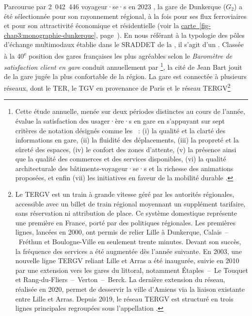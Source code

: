 \begin{refsegment}
Parcourue par 2~042~446 voyageur·se·s en 2023 \textcolor{blue}{\autocite{sncf_frequentation_2024}}, la gare de Dunkerque (\(G_2\)) a été sélectionnée pour son rayonnement régional, à la fois pour ses flux ferroviaires et pour son attractivité économique et résidentielle (voir la \hyperref[fig-chap3:monographie-dunkerque]{carte~\ref{fig-chap3:monographie-dunkerque}}, page~\pageref{fig-chap3:monographie-dunkerque}). En nous référant à la typologie des pôles d'échange multimodaux établie dans le \acrshort{SRADDET} de la \textcolor{blue}{\textcite[81]{region_hauts-de-france_sraddet_2024}}, il s'agit d'un . Classée à la 40\textsuperscript{e} position des gares françaises les plus agréables selon le \textsl{Baromètre de satisfaction client en gare} conduit annuellement par \textcolor{blue}{\textcite{sncf_gares__connexions_barometre_2023}}\footnote{
    Cette étude annuelle, menée sur deux périodes distinctes au cours de l’année, évalue la satisfaction des usager·ère·s en gare en s’appuyant sur sept critères de notation désignés comme les ~: (i) la qualité et la clarté des informations en gare, (ii) la fluidité des déplacements, (iii) la propreté et la sûreté des espaces, (iv) le confort des zones d’attente, (v) la présence ainsi que la qualité des commerces et des services disponibles, (vi) la qualité architecturale des bâtiments-voyageur·se·s et la richesse des animations proposées, et enfin (vii) les initiatives en faveur de la mobilité durable \textcolor{blue}{\autocite{sncf_gares__connexions_barometre_2023}}.
}, la cité de Jean Bart jouit de la gare jugée la plus confortable de la région. La gare est connectée à plusieurs réseaux, dont le \acrshort{TER}, le \acrshort{TGV} en provenance de Paris et le réseau \acrshort{TERGV}\footnote{
    Le \acrfull{TERGV} est un train à grande vitesse géré par les autorités régionales, accessible avec un billet de train régional moyennant un supplément tarifaire, sans réservation ni attribution de place. Ce système domestique représente une première en France, porté par des politiques régionales. Les premières lignes, lancées en 2000, ont permis de relier Lille à Dunkerque, Calais~–~Fréthun et Boulogne-Ville en seulement trente minutes. Devant son succès, la fréquence des services a été augmentée dès l’année suivante. En 2003, une nouvelle ligne \acrshort{TERGV} reliant Lille et Arras a été inaugurée, suivie en 2010 par une extension vers les gares du littoral, notamment Étaples~–~Le Touquet et Rang-du-Fliers~–~Verton~–~Berck. La dernière extension du réseau, réalisée en 2020, permet de desservir la ville d'Amiens via la liaison existante entre Lille et Arras. Depuis 2019, le réseau \acrshort{TERGV} est structuré en trois lignes principales regroupées sous l’appellation .
}
\end{refsegment}
